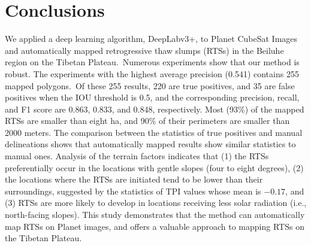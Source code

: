 \documentclass[authoryear,preprint,review,12pt]{elsarticle}
\begin{document}


\section{Conclusions}
\label{sec_conclusion}

We applied a deep learning algorithm, DeepLabv3+, to Planet CubeSat Images and automatically mapped retrogressive thaw slumps (RTSs) in the Beiluhe region on the Tibetan Plateau.~Numerous experiments show that our method is robust. The experiments with the highest average precision (0.541) contains 255 mapped polygons.~Of these 255 results, 220 are true positives, and 35 are false positives when the IOU threshold is 0.5, and the corresponding precision, recall, and F1 score are 0.863, 0.833, and 0.848, respectively. Most (93\%) of the mapped RTSs are smaller than eight ha, and 90\% of their perimeters are smaller than 2000 meters. The comparison between the statistics of true positives and manual delineations shows that automatically mapped results show similar statistics to manual ones. Analysis of the terrain factors indicates that (1) the RTSs preferentially occur in the locations with gentle slopes (four to eight degrees), (2) the locations where the RTSs are initiated tend to be lower than their surroundings, suggested by the statistics of TPI values whose mean is $-0.17$, and (3) RTSs are more likely to develop in locations receiving less solar radiation (i.e., north-facing slopes). This study demonstrates that the method can automatically map RTSs on Planet images, and offers a valuable approach to mapping RTSs on the Tibetan Plateau.
 
\end{document}
